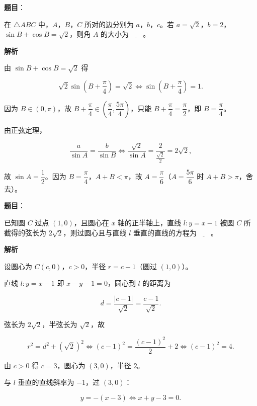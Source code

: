\begin{answer}

\textbf{题目}：

在 $\triangle ABC$ 中，$A$，$B$，$C$ 所对的边分别为 $a$，$b$，$c$。若 $a=\sqrt2$，$b=2$，$\sin B+\cos B=\sqrt2$，则角 $A$ 的大小为$\underline{\qquad}$。

\textbf{解析}

由 $\sin B+\cos B=\sqrt2$ 得

\nopagebreak[4]
\[\sqrt2\sin\left(B+\frac\pi4\right)=\sqrt2
\iff \sin\left(B+\frac\pi4\right)=1.\]

因为 $B\in(0,\pi)$，故 $B+\dfrac\pi4\in\left(\dfrac\pi4,\dfrac{5\pi}4\right)$，只能 $B+\dfrac\pi4=\dfrac\pi2$，即 $B=\dfrac\pi4$。

由正弦定理，

\nopagebreak[4]
\[\frac a{\sin A}=\frac b{\sin B}
\iff \frac{\sqrt2}{\sin A}=\frac2{\frac{\sqrt2}2}=2\sqrt2,\]

故 $\sin A=\dfrac12$。因为 $B=\dfrac\pi4$，$A+B<\pi$，故 $A=\dfrac\pi6$（$A=\dfrac{5\pi}6$ 时 $A+B>\pi$，舍去）。


\end{answer}
\begin{answer}

\textbf{题目}：

已知圆 $C$ 过点 $(1,0)$，且圆心在 $x$ 轴的正半轴上，直线 $l:y=x-1$ 被圆 $C$ 所截得的弦长为 $2\sqrt2$，则过圆心且与直线 $l$ 垂直的直线的方程为$\underline{\qquad}$。

\textbf{解析}

设圆心为 $C(c,0)$，$c>0$，半径 $r=c-1$（圆过 $(1,0)$）。

直线 $l:y=x-1$ 即 $x-y-1=0$，圆心到 $l$ 的距离为

\nopagebreak[4]
\[d=\frac{|c-1|}{\sqrt2}=\frac{c-1}{\sqrt2}.\]

弦长为 $2\sqrt2$，半弦长为 $\sqrt2$，故

\nopagebreak[4]
\[r^2=d^2+(\sqrt2)^2
\iff (c-1)^2=\frac{(c-1)^2}{2}+2
\iff (c-1)^2=4.\]

由 $c>0$ 得 $c=3$，圆心为 $(3,0)$，半径 $2$。

与 $l$ 垂直的直线斜率为 $-1$，过 $(3,0)$：

\nopagebreak[4]
\[y=-(x-3)\iff x+y-3=0.\]


\end{answer}
